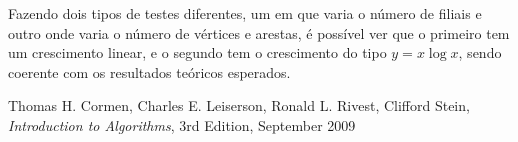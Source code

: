\documentclass[12pt,a4paper,notitlepage]{article}
\begin{document}
Fazendo dois tipos de testes diferentes, um em que varia o número de filiais e outro onde varia o número de vértices e arestas, é possível ver que o primeiro tem um crescimento linear, e o segundo tem o crescimento do tipo $y = x\log{x}$, sendo coerente com os resultados teóricos esperados.

\begin{center}
\end{center}

\begin{center}
\end{center}

\begin{thebibliography}{9}
				Thomas H. Cormen,
				Charles E. Leiserson,
				Ronald L. Rivest,
				Clifford Stein,
				\emph{Introduction to Algorithms},
				3rd Edition,
				September 2009
\end{thebibliography}
\end{document}

